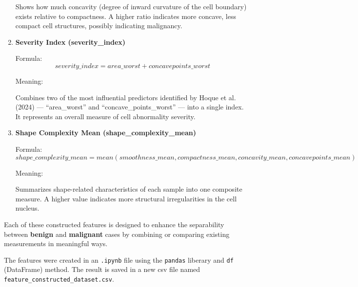 \documentclass{article}
\begin{document}
\begin{enumerate}
    Shows how much concavity (degree of inward curvature of the cell boundary) exists relative to compactness.
    A higher ratio indicates more concave, less compact cell structures, possibly indicating malignancy.

    \item \textbf{Severity Index (severity\_index)}

    Formula: $$severity\_index = area\_worst + concave points\_worst$$

    Meaning:
    
    Combines two of the most influential predictors identified by Hoque et al.
    (2024) — “area\_worst” and “concave\_points\_worst” — into a single index.
    It represents an overall measure of cell abnormality severity.

    \item \textbf{Shape Complexity Mean (shape\_complexity\_mean)}

    Formula: $$shape\_complexity\_mean = mean(smoothness\_mean, compactness\_mean, concavity\_mean, concave points\_mean)$$

    Meaning:
    
    Summarizes shape-related characteristics of each sample into one composite measure.
    A higher value indicates more structural irregularities in the cell nucleus.

\end{enumerate}

\vspace*{1 cm}

Each of these constructed features is designed to enhance the separability between \textbf{benign}
and \textbf{malignant} cases by combining or comparing existing measurements in meaningful ways.

\vspace*{1 cm}

The features were created in an \texttt{.ipynb} file using the \texttt{pandas} liberary and \texttt{df} (DataFrame) method.
The result is saved in a new csv file named \texttt{feature\_constructed\_dataset.csv}.
\end{document}
